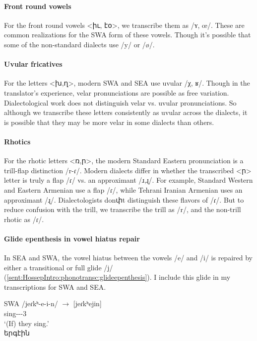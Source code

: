 \paragraph{Front round vowels}
For the front round vowels <իւ, էօ>, we transcribe them as /ʏ, œ/. These are common realizations for the SWA form of these vowels. Though it's possible that some of the non-standard dialects use /y/ or /ø/. 

\paragraph{Uvular fricatives}
For the letters <խ,ղ>, modern SWA and SEA use uvular /χ, ʁ/. Though in the translator's experience, velar pronunciations are possible as free variation. Dialectological work does not distinguish velar vs. uvular pronunciations. So although we transcribe these letters consistently as uvular across the dialects, it is possible that they may be more velar in some dialects than others. 

\paragraph{Rhotics}
For the rhotic letters <ռ,ր>, the modern Standard Eastern pronunciation is a trill-flap distinction /r-ɾ/. Modern dialects differ in whether the transcribed <ր> letter is truly a flap /ɾ/ vs. an approximant /ɹ,ɻ/. For example, Standard Western and Eastern Armenian use a flap /ɾ/, while Tehrani Iranian Armenian uses an approximant /ɻ/. Dialectologists donփt distinguish these flavors of /ɾ/. But to reduce confusion with the trill, we transcribe the trill as /r/, and the non-trill rhotic as /ɾ/. 


\paragraph{Glide epenthesis in vowel hiatus repair}

In SEA and SWA, the vowel hiatus between the vowels /e/ and /i/ is repaired by either a transitional or full glide /j/ (\ref{sent:HossepIntro:phonotransc:glideepenthesis}). I include this glide in my transcriptions for SWA and SEA. 

\begin{exe}
	\ex SWA
	\gll /jeɾkʰ-e-i-n/ $\rightarrow$ [jeɾkʰejin] \\
	sing-{\thgloss}-{\pst}-3{\pl} \\
	\trans `(If) they sing.' \label{sent:HossepIntro:phonotransc:glideepenthesis}\\
	երգէին
\end{exe}



